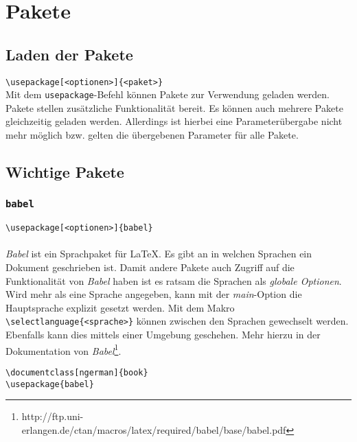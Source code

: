 \chapter{Pakete}
\section{Laden der Pakete}
\verb=\usepackage[<optionen>]{<paket>}=\\
Mit dem \verb=usepackage=-Befehl können Pakete zur Verwendung geladen werden. Pakete stellen zusätzliche Funktionalität bereit. Es können auch mehrere Pakete gleichzeitig geladen werden. Allerdings ist hierbei eine Parameterübergabe nicht mehr möglich bzw. gelten die übergebenen Parameter für alle Pakete.
\section{Wichtige Pakete}
\subsection{\texttt{babel}}
\verb=\usepackage[<optionen>]{babel}=\\
\\
\textsl{Babel} ist ein Sprachpaket für \LaTeX . Es gibt an in welchen Sprachen ein Dokument geschrieben ist. Damit andere Pakete auch Zugriff auf die Funktionalität von \textsl{Babel} haben ist es ratsam die Sprachen als \textsl{globale Optionen}. Wird mehr als eine Sprache angegeben, kann mit der \textsl{main}-Option die Hauptsprache explizit gesetzt werden. Mit dem Makro \verb=\selectlanguage{<sprache>}= können zwischen den Sprachen gewechselt werden. Ebenfalls kann dies mittels einer Umgebung geschehen. Mehr hierzu in der Dokumentation von \textsl{Babel}\footnote{http://ftp.uni-erlangen.de/ctan/macros/latex/required/babel/base/babel.pdf}.
\begin{lstlisting}[caption={Babel, globale Optionen}]
\documentclass[ngerman]{book}
\usepackage{babel}
\end{lstlisting}
